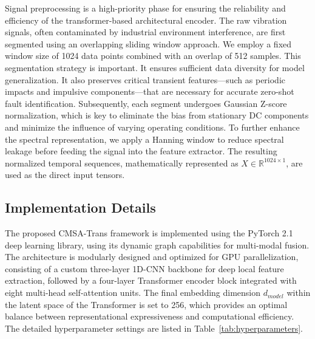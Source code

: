 \documentclass[journal]{IEEEtran}
\begin{document}
Signal preprocessing is a high-priority phase for ensuring the reliability and efficiency of the transformer-based architectural encoder. The raw vibration signals, often contaminated by industrial environment interference, are first segmented using an overlapping sliding window approach. We employ a fixed window size of 1024 data points combined with an overlap of 512 samples. This segmentation strategy is important. It ensures sufficient data diversity for model generalization. It also preserves critical transient features---such as periodic impacts and impulsive components---that are necessary for accurate zero-shot fault identification. Subsequently, each segment undergoes Gaussian Z-score normalization, which is key to eliminate the bias from stationary DC components and minimize the influence of varying operating conditions. To further enhance the spectral representation, we apply a Hanning window to reduce spectral leakage before feeding the signal into the feature extractor. The resulting normalized temporal sequences, mathematically represented as $X \in \mathbb{R}^{1024 \times 1}$, are used as the direct input tensors.

\subsection{Implementation Details}

The proposed CMSA-Trans framework is implemented using the PyTorch 2.1 deep learning library, using its dynamic graph capabilities for multi-modal fusion. The architecture is modularly designed and optimized for GPU parallelization, consisting of a custom three-layer 1D-CNN backbone for deep local feature extraction, followed by a four-layer Transformer encoder block integrated with eight multi-head self-attention units. The final embedding dimension $d_{model}$ within the latent space of the Transformer is set to 256, which provides an optimal balance between representational expressiveness and computational efficiency. The detailed hyperparameter settings are listed in Table~\ref{tab:hyperparameters}.


\end{document}
